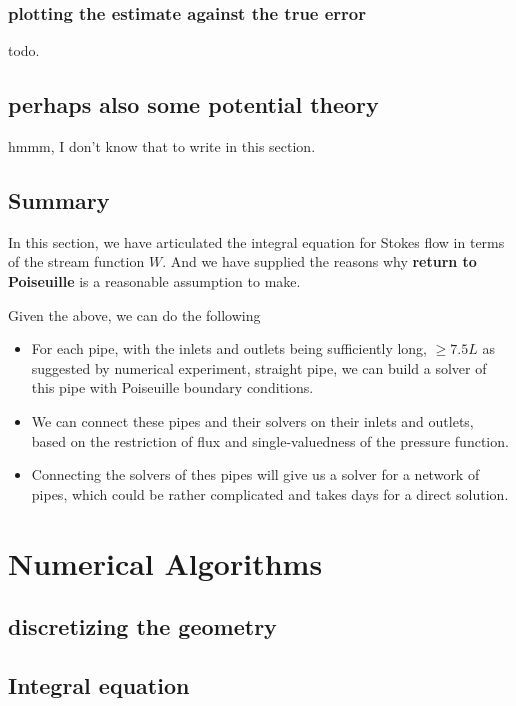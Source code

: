 \documentclass[11pt]{article}
\newtheorem[L]{thm}{Theorem}[section]
\begin{document}
\subsubsection{plotting the estimate against the true error}
todo. 

\subsection{perhaps also some potential theory}

hmmm, I don't know that to write in this section. 

\subsection{Summary}

In this section, we have articulated the integral equation for Stokes flow in terms of the stream function $W$.  And we have supplied the reasons why \textbf{return to Poiseuille} is a reasonable assumption to make. 

Given the above, we can do the following 

\begin{itemize}
  \item For each pipe, with the inlets and outlets being sufficiently long, $\ge 7.5 L$ as suggested by numerical experiment, straight pipe, we can build a solver of this pipe with Poiseuille boundary conditions. 
  \item We can connect these pipes and their solvers on their inlets and outlets, based on the restriction of flux and single-valuedness of the pressure function. 
  \item Connecting the solvers of thes pipes will give us a solver for a network of pipes, which could be rather complicated and takes days for a direct solution. 
\end{itemize}


\newpage
\section{Numerical Algorithms}

\subsection{discretizing the geometry}

\subsection{Integral equation}
\end{document}
